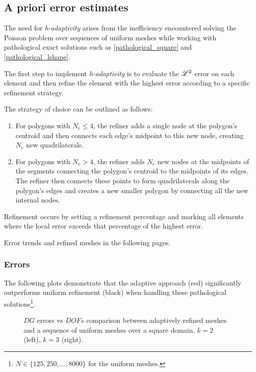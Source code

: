 \subsection{A priori error estimates}

The need for \textit{h-adaptivity} arises from the inefficiency encountered solving the Poisson problem over sequences of uniform meshes while working with pathological exact solutions such as \eqref{pathological_square} and \eqref{pathological_lshape}.

The first step to implement \textit{h-adaptivity} is to evaluate the $\mathscr{L}^2$ error on each element and then refine the element with the highest error according to a specific refinement strategy.

The strategy of choice can be outlined as follows:

\begin{enumerate}
    \item For polygons with $N_e \leq 4$, the refiner adds a single node at the polygon's centroid and then connects each edge's midpoint to this new node, creating $N_e$ new quadrilaterals.
    \item For polygons with $N_e > 4$, the refiner adds $N_e$ new nodes at the midpoints of the segments connecting the polygon's centroid to the midpoints of its edges. The refiner then connects these points to form quadrilaterals along the polygon's edges and creates a new smaller polygon by connecting all the new internal nodes.
\end{enumerate}

Refinement occurs by setting a refinement percentage and marking all elements where the local error exceeds that percentage of the highest error.

Error trends and refined meshes in the following pages.

\newpage
\subsubsection{Errors}

The following plots demonstrate that the adaptive approach (red) significantly outperforms uniform refinement (black) when handling these pathological solutions\footnote{$N \in \{125, 250, \dots, 8000\}$ for the uniform meshes.}.

\begin{figure}[!ht]
	\begin{subfigure}[b]{0.45\textwidth}
		
	\end{subfigure}
	\hfill
	\begin{subfigure}[b]{0.45\textwidth}
		
	\end{subfigure}
    \caption{$DG$ errors vs $DOFs$ comparison between adaptively refined meshes and a sequence of uniform meshes over a square domain. $k = 2$ (left), $k = 3$ (right).}
\end{figure}

